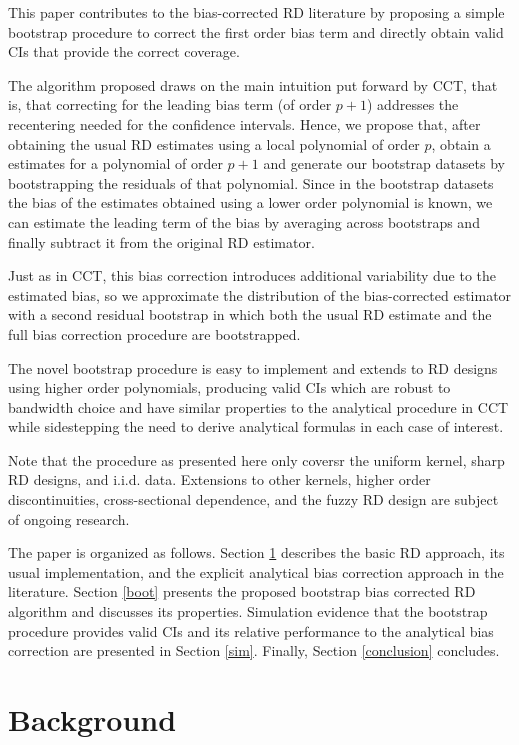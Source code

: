 \documentclass[12pt,fleqn]{article}
\begin{document}
This paper contributes to the bias-corrected RD literature by proposing a simple
bootstrap procedure to correct the first order bias term and directly obtain 
valid CIs that provide the correct coverage.

The algorithm proposed draws on the main intuition put forward by CCT, that is, that correcting for the leading bias term (of order $p+1$) addresses the recentering needed for the confidence intervals. Hence, we propose that, after obtaining the usual RD estimates using a local polynomial of order $p$, obtain a estimates for a polynomial of order $p+1$ and generate our bootstrap datasets by bootstrapping the residuals of that polynomial. Since in the bootstrap datasets the bias of the estimates obtained using a lower order polynomial is known, we can estimate the leading term of the bias by averaging across bootstraps and finally subtract it from the original RD estimator.

Just as in CCT, this bias correction introduces additional variability due to the estimated bias, so we approximate the distribution of the bias-corrected estimator with a second residual bootstrap in which both the usual RD estimate and the full bias correction procedure are bootstrapped.

The novel bootstrap procedure is easy to implement and extends to RD designs 
using higher order polynomials, producing valid CIs which are robust to 
bandwidth choice and have similar properties to the analytical procedure in 
CCT while sidestepping the need to derive analytical formulas in each case of interest.

Note that the procedure as presented here only coversr the uniform kernel, sharp RD designs, and i.i.d. data. Extensions to other kernels, higher order discontinuities, cross-sectional dependence, and the fuzzy RD design are subject of ongoing research.

The paper is organized as follows. Section \ref{background} describes the basic
RD approach, its usual implementation, and the explicit analytical bias 
correction approach in the literature. Section \ref{boot} presents the proposed 
bootstrap bias corrected RD algorithm and discusses its properties. Simulation
evidence that the bootstrap procedure provides valid CIs and its relative 
performance to the analytical bias correction are presented in Section \ref{sim}.
Finally, Section \ref{conclusion} concludes.

\section{Background}\label{background}
\end{document}
